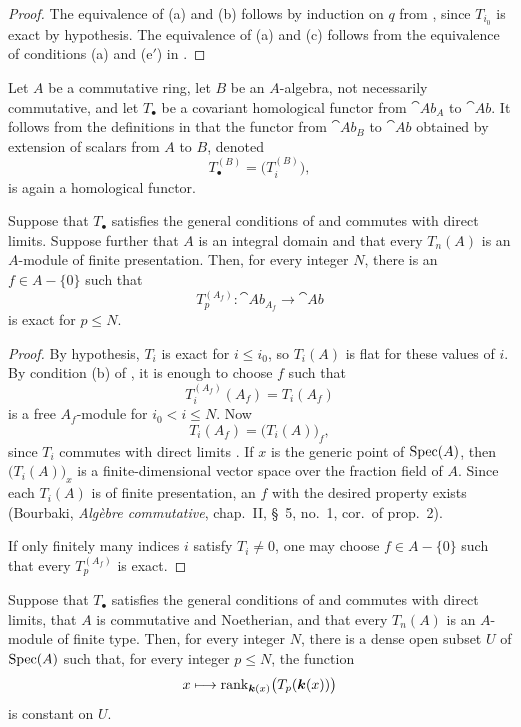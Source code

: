 \begin{proof}
The equivalence of (a) and (b) follows by induction on $q$ from
, since $T_{i_0}$ is exact by hypothesis.  The
equivalence of (a) and (c) follows from the equivalence of
conditions (a) and ($\mathrm{e}'$) in .
\end{proof}


\begin{env}[7.3.8]
\label{III.7.3.8}
Let $A$ be a commutative ring, let $B$ be an $A$-algebra, not
necessarily commutative, and let $T_\bullet$ be a covariant
homological functor from $\cat{Ab}_A$ to $\cat{Ab}$.  It
follows from the definitions in  that the
functor from $\cat{Ab}_B$ to $\cat{Ab}$ obtained by extension
of scalars from $A$ to $B$, denoted
\[
  T_\bullet^{(B)}=\bigl(T_i^{(B)}\bigr),
\]
is again a homological functor.
\end{env}

\begin{corollary}[7.3.9]
\label{III.7.3.9}
Suppose that $T_\bullet$ satisfies the general conditions of
 and commutes with direct limits.  Suppose
further that $A$ is an integral domain and that every $T_n(A)$
is an $A$-module of finite presentation.  Then, for every
integer $N$, there is an $f\in A-\{0\}$ such that
\[
  T_p^{(A_f)}:\cat{Ab}_{A_f}\longrightarrow\cat{Ab}
\]
is exact for $p\leq N$.
\end{corollary}

\begin{proof}
By hypothesis, $T_i$ is exact for $i\leq i_0$, so $T_i(A)$ is
flat for these values of $i$.  By condition (b) of
, it is enough to choose $f$ such that
\[
  T_i^{(A_f)}(A_f)=T_i(A_f)
\]
is a free $A_f$-module for $i_0<i\leq N$.  Now
\[
  T_i(A_f)=\bigl(T_i(A)\bigr)_f,
\]
since $T_i$ commutes with direct limits .  If
$x$ is the generic point of $\operatorname{Spec}(A)$, then
$\bigl(T_i(A)\bigr)_x$ is a finite-dimensional vector space
over the fraction field of $A$.  Since each $T_i(A)$ is of
finite presentation, an $f$ with the desired property exists
(Bourbaki, \emph{Alg\`ebre commutative}, chap.~II, \S~5,
no.~1, cor.\ of prop.~2).

If only finitely many indices $i$ satisfy $T_i\neq0$, one may
choose $f\in A-\{0\}$ such that every $T_p^{(A_f)}$ is exact.
\end{proof}

\begin{corollary}[7.3.10]
\label{III.7.3.10}
Suppose that $T_\bullet$ satisfies the general conditions of
 and commutes with direct limits, that $A$ is
commutative and Noetherian, and that every $T_n(A)$ is an
$A$-module of finite type.  Then, for every integer $N$, there
is a dense open subset $U$ of $\operatorname{Spec}(A)$ such that, for every
integer $p\leq N$, the function
\[
  x\longmapsto
  \operatorname{rank}_{\boldsymbol{k}(x)}
  \bigl(T_p(\boldsymbol{k}(x))\bigr)
\]
is constant on $U$.
\end{corollary}

